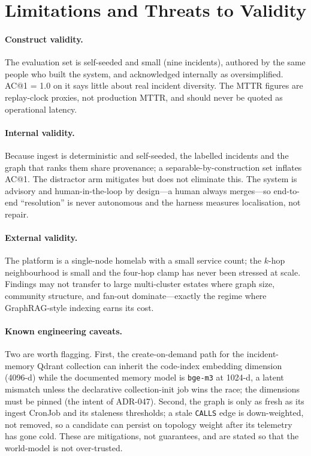 \documentclass[11pt]{article}
\begin{document}
\section{Limitations and Threats to Validity}

\paragraph{Construct validity.}
The evaluation set is self-seeded and small (nine incidents), authored by the
same people who built the system, and acknowledged internally as oversimplified.
AC@1 = 1.0 on it says little about real incident diversity. The MTTR figures are
replay-clock proxies, not production MTTR, and should never be quoted as
operational latency.

\paragraph{Internal validity.}
Because ingest is deterministic and self-seeded, the labelled incidents and the
graph that ranks them share provenance; a separable-by-construction set inflates
AC@1. The distractor arm mitigates but does not eliminate this. The system is
advisory and human-in-the-loop by design---a human always merges---so end-to-end
``resolution'' is never autonomous and the harness measures localisation, not
repair.

\paragraph{External validity.}
The platform is a single-node homelab with a small service count; the $k$-hop
neighbourhood is small and the four-hop clamp has never been stressed at scale.
Findings may not transfer to large multi-cluster estates where graph size,
community structure, and fan-out dominate---exactly the regime where
GraphRAG-style indexing \citep{edge2024graphrag} earns its cost.

\paragraph{Known engineering caveats.}
Two are worth flagging. First, the create-on-demand path for the incident-memory
Qdrant collection can inherit the code-index embedding dimension (4096-d) while
the documented memory model is \texttt{bge-m3} at 1024-d, a latent mismatch
unless the declarative collection-init job wins the race; the dimensions must be
pinned (the intent of ADR-047). Second, the graph is only as fresh as its ingest
CronJob and its staleness thresholds; a stale \texttt{CALLS} edge is
down-weighted, not removed, so a candidate can persist on topology weight after
its telemetry has gone cold. These are mitigations, not guarantees, and are
stated so that the world-model is not over-trusted.
\end{document}
